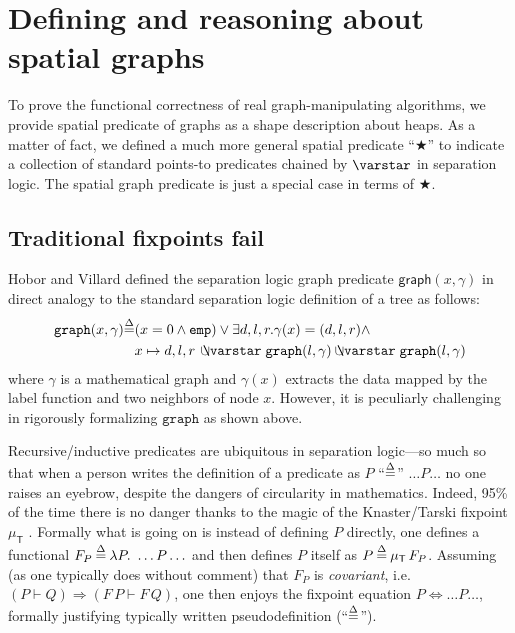 \section{Defining and reasoning about spatial graphs}

To prove the functional correctness of real graph-manipulating
algorithms, we provide spatial predicate of graphs as a shape
description about heaps. As a matter of fact, we defined a much more
general spatial predicate ``$\bigstar$'' to indicate a collection of
standard points-to predicates chained by $\scon$ in separation
logic. The spatial graph predicate is just a special case in terms of
$\bigstar$.



\subsection{Traditional fixpoints fail}

Hobor and Villard\cite{hobor:ramification} defined the separation
logic graph predicate $\mathsf{graph}(x,\gamma)$ in direct analogy to
the standard separation logic definition of a tree as follows:
\begin{equation*}\label{eqn:graph}
  \begin{split}
  \mathtt{graph}(x, \gamma)\defeq & (x = 0 \wedge \mathtt{emp}) \vee
  \exists d,l,r . \gamma(x)=(d,l,r) \wedge \\ & x \mapsto d,l,r\,
  \ocon \mathtt{graph}(l, \gamma) \ocon \mathtt{graph}(l, \gamma)
  \end{split}
\end{equation*}
where $\gamma$ is a mathematical graph and $\gamma(x)$ extracts the
data mapped by the label function and two neighbors of node
$x$. However, it is peculiarly challenging in rigorously formalizing
$\mathtt{graph}$ as shown above.


Recursive/inductive predicates are ubiquitous in separation logic---so
much so that when a person writes the definition of a predicate as $P$
``$\mathbin{\stackrel{\Delta}{=}}$'' $\ldots P \ldots$ no one raises an eyebrow, despite the
dangers of circularity in mathematics. Indeed, 95\% of the time there
is no danger thanks to the magic of the Knaster/Tarski fixpoint
$\mu_{\mathsf{T}}$ \cite{tarski:fixpoint}. Formally what is going on
is instead of defining $P$ directly, one defines a functional $F_P
\mathbin{\stackrel{\Delta}{=}} \lambda P.~ \ldots P \ldots$ and then defines $P$ itself as $P
\mathbin{\stackrel{\Delta}{=}} \mu_{\mathsf{T}} \, F_P$.  Assuming (as one typically does
without comment) that $F_P$ is \emph{covariant}, i.e. $(P \vdash Q)
\Rightarrow (F \, P \vdash F \, Q)$, one then enjoys the fixpoint
equation $P \Leftrightarrow \ldots P \ldots$, formally justifying
typically written pseudodefinition (``$\mathbin{\stackrel{\Delta}{=}}$'').

